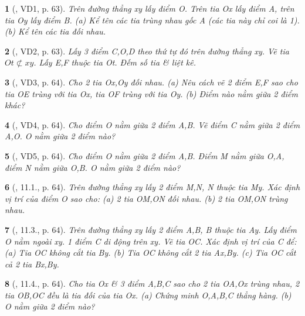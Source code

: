 \documentclass{article}
\newtheorem{baitoan}{}
\begin{document}
\begin{baitoan}[\cite{Binh_boi_duong_Toan_6_tap_2}, VD1, p. 63]
	Trên đường thẳng xy lấy điểm O. Trên tia Ox lấy điểm A, trên tia Oy lấy điểm B. (a) Kể tên các tia trùng nhau gốc A (các tia này chỉ coi là 1). (b) Kể tên các tia đối nhau.
\end{baitoan}

\begin{baitoan}[\cite{Binh_boi_duong_Toan_6_tap_2}, VD2, p. 63]
	Lấy 3 điểm C,O,D theo thứ tự đó trên đường thẳng xy. Vẽ tia $Ot\not\subset xy$. Lấy E,F thuộc tia Ot. Đếm số tia \& liệt kê.
\end{baitoan}

\begin{baitoan}[\cite{Binh_boi_duong_Toan_6_tap_2}, VD3, p. 64]
	Cho 2 tia Ox,Oy đối nhau. (a) Nêu cách vẽ 2 điểm E,F sao cho tia OE trùng với tia Ox, tia OF trùng với tia Oy. (b) Điểm nào nằm giữa 2 điểm khác?
\end{baitoan}

\begin{baitoan}[\cite{Binh_boi_duong_Toan_6_tap_2}, VD4, p. 64]
	Cho điểm O nằm giữa 2 điểm A,B. Vẽ điểm C nằm giữa 2 điểm A,O. O nằm giữa 2 điểm nào?
\end{baitoan}

\begin{baitoan}[\cite{Binh_boi_duong_Toan_6_tap_2}, VD5, p. 64]
	Cho điểm O nằm giữa 2 điểm A,B. Điểm M nằm giữa O,A, điểm N nằm giữa O,B. O nằm giữa 2 điểm nào?
\end{baitoan}

\begin{baitoan}[\cite{Binh_boi_duong_Toan_6_tap_2}, 11.1., p. 64]
	Trên đường thẳng xy lấy 2 điểm M,N, N thuộc tia My. Xác định vị trí của điểm O sao cho: (a) 2 tia OM,ON đối nhau. (b) 2 tia OM,ON trùng nhau.
\end{baitoan}

\begin{baitoan}[\cite{Binh_boi_duong_Toan_6_tap_2}, 11.3., p. 64]
	Trên đường thẳng xy lấy 2 điểm A,B, B thuộc tia Ay. Lấy điểm O nằm ngoài xy. 1 điểm C di động trên xy. Vẽ tia OC. Xác định vị trí của C để: (a) Tia OC không cắt tia By. (b) Tia OC không cắt 2 tia Ax,By. (c) Tia OC cắt cả 2 tia Bx,By.
\end{baitoan}

\begin{baitoan}[\cite{Binh_boi_duong_Toan_6_tap_2}, 11.4., p. 64]
	Cho tia Ox \& 3 điểm A,B,C sao cho 2 tia OA,Ox trùng nhau, 2 tia OB,OC đều là tia đối của tia Ox. (a) Chứng minh O,A,B,C thẳng hàng. (b) O nằm giữa 2 điểm nào?
\end{baitoan}
\end{document}
